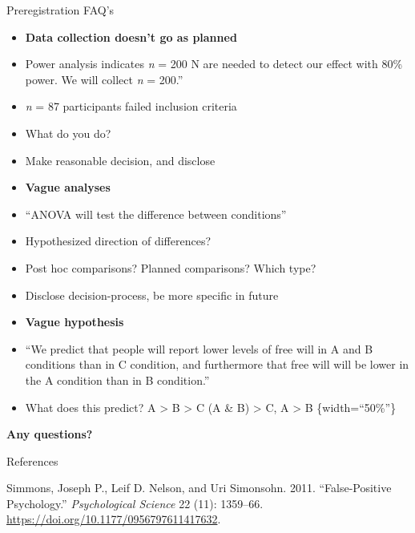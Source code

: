 \documentclass[
  ignorenonframetext,
  aspectratio=169,
]{beamer}
\providecommand{\tightlist}{%
  \setlength{\itemsep}{0pt}\setlength{\parskip}{0pt}}\usepackage{longtable,booktabs,array}
\newlength{\cslhangindent}
\newenvironment{CSLReferences}[2] %
 {\begin{list}{}{%
  \setlength{\itemindent}{0pt}
  \setlength{\leftmargin}{0pt}
  \setlength{\parsep}{0pt}
  \ifodd #1
   \setlength{\leftmargin}{\cslhangindent}
   \setlength{\itemindent}{-1\cslhangindent}
  \fi
  \setlength{\itemsep}{#2\baselineskip}}}
 {\end{list}}
\begin{document}
\begin{frame}{Preregistration FAQ's}
\label{preregistration-faqs-1}
\begin{itemize}
\tightlist
\item
  \textbf{Data collection doesn't go as planned}
\item
  Power analysis indicates \emph{n} = 200 N are needed to detect our
  effect with 80\% power. We will collect \emph{n} = 200.''
\item
  \emph{n} = 87 participants failed inclusion criteria
\item
  What do you do?
\item
  Make reasonable decision, and disclose
\item
  \textbf{Vague analyses}
\item
  ``ANOVA will test the difference between conditions''
\item
  Hypothesized direction of differences?
\item
  Post hoc comparisons? Planned comparisons? Which type?
\item
  Disclose decision-process, be more specific in future
\item
  \textbf{Vague hypothesis}
\item
  ``We predict that people will report lower levels of free will in A
  and B conditions than in C condition, and furthermore that free will
  will be lower in the A condition than in B condition.''
\item
  What does this predict? A \textgreater{} B \textgreater{} C (A \& B)
  \textgreater{} C, A \textgreater{} B \{width=``50\%''\}
\end{itemize}

\textbf{Any questions?}
\end{frame}

\begin{frame}{References}
\label{references}
\label{refs}
\begin{CSLReferences}{1}{0}
Simmons, Joseph P., Leif D. Nelson, and Uri Simonsohn. 2011.
{``False-Positive Psychology.''} \emph{Psychological Science} 22 (11):
1359--66. \url{https://doi.org/10.1177/0956797611417632}.

\end{CSLReferences}
\end{frame}
\end{document}

